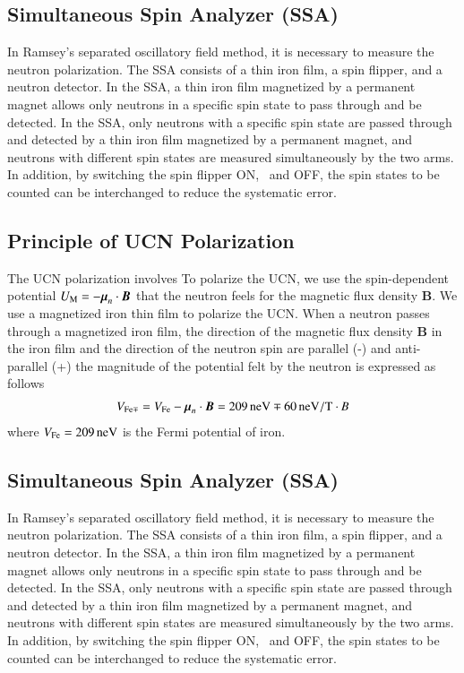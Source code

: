 \documentclass{jps-cp}
\begin{document}
\subsection{Simultaneous Spin Analyzer (SSA)}
In Ramsey's separated oscillatory field method, it is necessary to measure the neutron polarization.
The SSA consists of a thin iron film, a spin flipper, and a neutron detector. In the SSA, a thin iron film magnetized by a permanent magnet allows only neutrons in a specific spin state to pass through and be detected. In the SSA, only neutrons with a specific spin state are passed through and detected by a thin iron film magnetized by a permanent magnet, and neutrons with different spin states are measured simultaneously by the two arms. In addition, by switching the spin flipper ON, \, and OFF, the spin states to be counted can be interchanged to reduce the systematic error.

\subsection{Principle of UCN Polarization}
The UCN polarization involves
To polarize the UCN, we use the spin-dependent potential $U_{\rm M}=-\boldsymbol \mu_n\cdot {\boldsymbol B}$ that the neutron feels for the magnetic flux density $\boldsymbol B$.
We use a magnetized iron thin film to polarize the UCN. When a neutron passes through a magnetized iron film, the direction of the magnetic flux density $\boldsymbol {B}$ in the iron film and the direction of the neutron spin are parallel (-) and
anti-parallel (+)
the magnitude of the potential felt by the neutron is expressed as follows
\begin {align}
V_{\rm Fe \mp}=V_{\rm Fe}-{\boldsymbol\mu_n}\cdot {\boldsymbol {B}}=209\,\rm neV \mp 60\,\rm neV/T \cdot{\it B}
\label{Vp,Vap}
\end{align}
where $V_{\rm Fe}=209\,\rm neV$ is the Fermi potential of iron.
\subsection{Simultaneous Spin Analyzer (SSA)}
In Ramsey's separated oscillatory field method, it is necessary to measure the neutron polarization.
The SSA consists of a thin iron film, a spin flipper, and a neutron detector. In the SSA, a thin iron film magnetized by a permanent magnet allows only neutrons in a specific spin state to pass through and be detected. In the SSA, only neutrons with a specific spin state are passed through and detected by a thin iron film magnetized by a permanent magnet, and neutrons with different spin states are measured simultaneously by the two arms. In addition, by switching the spin flipper ON, \, and OFF, the spin states to be counted can be interchanged to reduce the systematic error.
\end{document}
